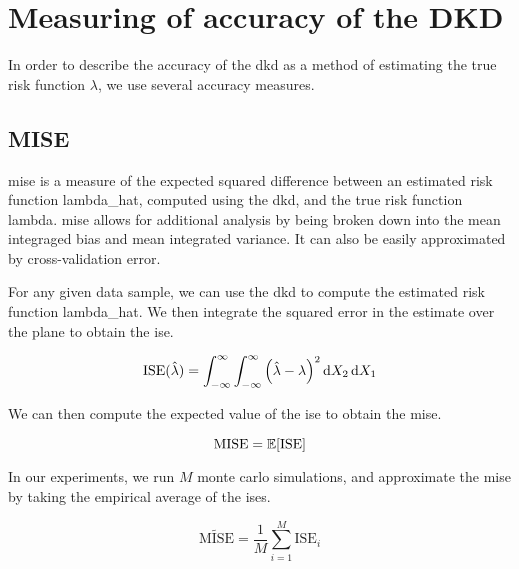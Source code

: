 \section{Measuring of accuracy of the DKD}
\label{sec:method:accuracy}

In order to describe the accuracy of the \gls{dkd} as a method of estimating the true risk function \(\lambda\),
we use several accuracy measures.

\subsection{MISE}
\label{subsec:method:mise}

\Gls{mise} is a measure of the expected squared difference between an estimated risk function \gls{lambda_hat},
computed using the \gls{dkd}, and the true risk function \gls{lambda}.
\Gls{mise} allows for additional analysis by being broken down into the mean integraged bias and mean integrated variance.
It can also be easily approximated by cross-validation error.

For any given data sample, we can use the \gls{dkd} to compute the estimated risk function \gls{lambda_hat}.
We then integrate the squared error in the estimate over the plane to obtain the \gls{ise}.

\begin{equation}
    \mbox{ISE}(\hat{\lambda}) = \int_{-\infty}^{\infty} \int_{-\infty}^{\infty} \left( \hat{\lambda} - \lambda \right)^2 \mathop{}\!\mathrm{d}{X_2} \mathop{}\!\mathrm{d}{X_1}
\end{equation}

We can then compute the expected value of the \gls{ise} to obtain the \gls{mise}.

\begin{equation}
    \mbox{MISE} = \mathbb{E} [\mbox{ISE}]
\end{equation}

In our experiments, we run \(M\) monte carlo simulations, and approximate the \gls{mise} by taking the empirical average of the \glspl{ise}.

\begin{equation}
    \widetilde{\mbox{MISE}} = \frac{1}{M} \sum_{i=1}^{M} \mbox{ISE}_i
\end{equation}

